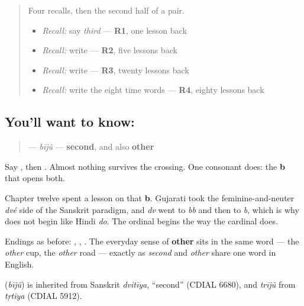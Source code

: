 \label{lesson:GU-C38-biju}



\begin{quote}
Four recalls, then the second half of a pair.

\begin{itemize}
\raggedright
  \item \emph{Recall:} say \emph{third} — \textbf{R1}, one lesson back
  \item \emph{Recall:} write \textbf{} — \textbf{R2}, five lessons back
  \item \emph{Recall:} write \textbf{} — \textbf{R3}, twenty lessons back
  \item \emph{Recall:} write the eight time words — \textbf{R4}, eighty lessons back
\end{itemize}
\end{quote}

\subsection*{You'll want to know: }
\begin{quote}
\textbf{} — \emph{bījũ} — \textbf{second}, and also \textbf{other}
\end{quote}

Say \textbf{}, then \textbf{}. Almost nothing survives the crossing. One consonant does: the \textbf{b} that opens both.

Chapter twelve spent a lesson on that \textbf{b}. Gujarati took the feminine-and-neuter \emph{dvé} side of the Sanskrit paradigm, and \emph{dv} went to \emph{bb} and then to \emph{b}, which is why \textbf{} does not begin like Hindi \emph{do}. The ordinal begins the way the cardinal does.

Endings as before: \textbf{}, \textbf{}, \textbf{}. The everyday sense of \textbf{other} sits in the same word — the \emph{other} cup, the \emph{other} road — exactly as \emph{second} and \emph{other} share one word in English.

\begin{cousinweb}
\textbf{} (\emph{bījũ}) is inherited from Sanskrit \emph{dvitīya}, \textquotedblleft{}second\textquotedblright{} (CDIAL 6680), and \emph{trījũ} from \emph{tṛtīya} (CDIAL 5912).
\end{cousinweb}

